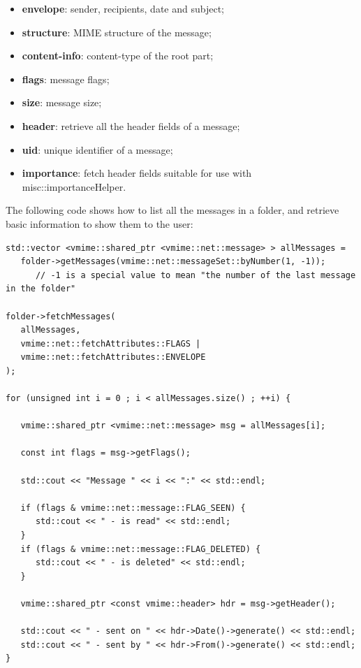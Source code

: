 \begin{itemize}
\item {\bf envelope}: sender, recipients, date and subject;
\item {\bf structure}: MIME structure of the message;
\item {\bf content-info}: content-type of the root part;
\item {\bf flags}: message flags;
\item {\bf size}: message size;
\item {\bf header}: retrieve all the header fields of a message;
\item {\bf uid}: unique identifier of a message;
\item {\bf importance}: fetch header fields suitable for use with
{\vcode misc::importanceHelper}.
\end{itemize}


The following code shows how to list all the messages in a folder, and
retrieve basic information to show them to the user:

\begin{lstlisting}[caption={Fetching information about multiple messages}]
std::vector <vmime::shared_ptr <vmime::net::message> > allMessages =
   folder->getMessages(vmime::net::messageSet::byNumber(1, -1));
      // -1 is a special value to mean "the number of the last message in the folder"

folder->fetchMessages(
   allMessages,
   vmime::net::fetchAttributes::FLAGS |
   vmime::net::fetchAttributes::ENVELOPE
);

for (unsigned int i = 0 ; i < allMessages.size() ; ++i) {

   vmime::shared_ptr <vmime::net::message> msg = allMessages[i];

   const int flags = msg->getFlags();

   std::cout << "Message " << i << ":" << std::endl;

   if (flags & vmime::net::message::FLAG_SEEN) {
      std::cout << " - is read" << std::endl;
   }
   if (flags & vmime::net::message::FLAG_DELETED) {
      std::cout << " - is deleted" << std::endl;
   }

   vmime::shared_ptr <const vmime::header> hdr = msg->getHeader();

   std::cout << " - sent on " << hdr->Date()->generate() << std::endl;
   std::cout << " - sent by " << hdr->From()->generate() << std::endl;
}
\end{lstlisting}

